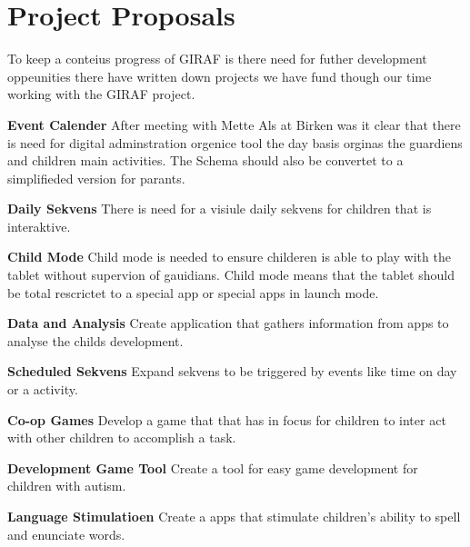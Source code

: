 \chapter{Project Proposals}
\label{chap:projectProposals}
To keep a conteius progress of GIRAF is there need for futher development oppeunities there have written down projects we have fund though our time working with the GIRAF project.   

\textbf{Event Calender} 
After meeting with Mette Als at Birken was it clear that there is need for digital adminstration orgenice tool the day basis orginas the guardiens and children main activities.
The Schema should also be convertet to a simplifieded version for parants.   

\textbf{Daily Sekvens}
There is need for a visiule daily sekvens for children that is interaktive.     

\textbf{Child Mode}
Child mode is needed to ensure childeren is able to play with the tablet without supervion of gauidians.
Child mode means that the tablet should be total rescrictet to a special app or special apps in launch mode.     

\textbf{Data and Analysis}
Create application that gathers information from apps to analyse the childs development. 

\textbf{Scheduled Sekvens}
Expand sekvens to be triggered by events like time on day or a activity.

\textbf{Co-op Games}
Develop a game that that has in focus for children to inter act with other children to accomplish a task.

\textbf{Development Game Tool}
Create a tool for easy game development for children with autism.  

\textbf{Language Stimulatioen}
Create a apps that stimulate children's ability to spell and enunciate words.       

